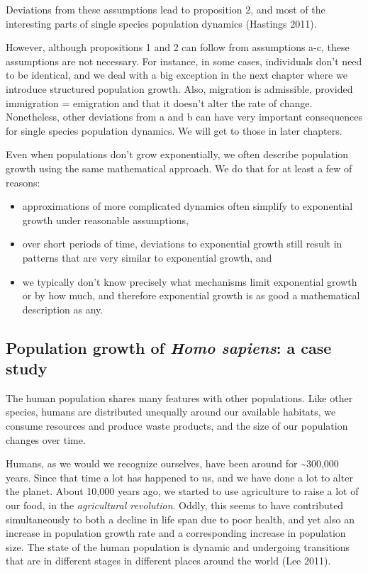 \documentclass[
  letterpaper,
  DIV=11,
  numbers=noendperiod]{scrreprt}
\providecommand{\tightlist}{%
  \setlength{\itemsep}{0pt}\setlength{\parskip}{0pt}}
\begin{document}
Deviations from these assumptions lead to proposition 2, and most of the
interesting parts of single species population dynamics (Hastings 2011).

However, although propositions 1 and 2 can follow from assumptions a-c,
these assumptions are not necessary. For instance, in some cases,
individuals don't need to be identical, and we deal with a big exception
in the next chapter where we introduce structured population growth.
Also, migration is admissible, provided immigration = emigration and
that it doesn't alter the rate of change. Nonetheless, other deviations
from a and b can have very important consequences for single species
population dynamics. We will get to those in later chapters.

Even when populations don't grow exponentially, we often describe
population growth using the same mathematical approach. We do that for
at least a few of reasons:

\begin{itemize}
\tightlist
\item
  approximations of more complicated dynamics often simplify to
  exponential growth under reasonable assumptions,
\item
  over short periods of time, deviations to exponential growth still
  result in patterns that are very similar to exponential growth, and
\item
  we typically don't know precisely what mechanisms limit exponential
  growth or by how much, and therefore exponential growth is as good a
  mathematical description as any.
\end{itemize}

\subsection{\texorpdfstring{Population growth of \emph{Homo sapiens}: a
case
study}{Population growth of Homo sapiens: a case study}}\label{population-growth-of-homo-sapiens-a-case-study}

The human population shares many features with other populations. Like
other species, humans are distributed unequally around our available
habitats, we consume resources and produce waste products, and the size
of our population changes over time.

Humans, as we would we recognize ourselves, have been around for
\textasciitilde300,000 years. Since that time a lot has happened to us,
and we have done a lot to alter the planet. About 10,000 years ago, we
started to use agriculture to raise a lot of our food, in the
\emph{agricultural revolution}. Oddly, this seems to have contributed
simultaneously to both a decline in life span due to poor health, and
yet also an increase in population growth rate and a corresponding
increase in population size. The state of the human population is
dynamic and undergoing transitions that are in different stages in
different places around the world (Lee 2011).
\end{document}
